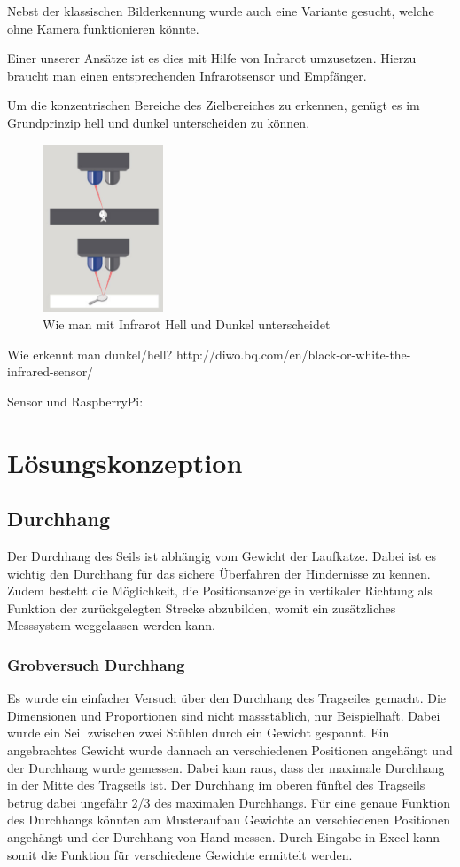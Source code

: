 \documentclass[a4paper]{report}
\begin{document}
Nebst der klassischen Bilderkennung wurde auch eine Variante gesucht, welche ohne Kamera funktionieren könnte.

Einer unserer Ansätze ist es dies mit Hilfe von Infrarot umzusetzen. Hierzu braucht man einen entsprechenden Infrarotsensor und Empfänger.

Um die konzentrischen Bereiche des Zielbereiches zu erkennen, genügt es im Grundprinzip hell und dunkel unterscheiden zu können.

\begin{figure}[h!]
	\centering
	\includegraphics[keepaspectratio,height=5cm]{InfrarotHellDunkel}
	\caption{Wie man mit Infrarot Hell und Dunkel unterscheidet}
	\label{fig:InfrarotHellDunkel}
\end{figure}


Wie erkennt man dunkel/hell?
http://diwo.bq.com/en/black-or-white-the-infrared-sensor/

Sensor und RaspberryPi:

\parencite{Aswinth2017}

\chapter{Lösungskonzeption}
\section{Durchhang}
Der Durchhang des Seils ist abhängig vom Gewicht der Laufkatze. Dabei ist es wichtig den Durchhang für das sichere Überfahren der Hindernisse zu kennen. Zudem besteht die Möglichkeit, die Positionsanzeige in vertikaler Richtung als Funktion der zurückgelegten Strecke abzubilden, womit ein zusätzliches Messsystem weggelassen werden kann.

\subsection{Grobversuch Durchhang}
Es wurde ein einfacher Versuch über den Durchhang des Tragseiles gemacht. Die Dimensionen und Proportionen sind nicht massstäblich, nur Beispielhaft. Dabei wurde ein Seil zwischen zwei Stühlen durch ein Gewicht gespannt. Ein angebrachtes Gewicht wurde dannach an verschiedenen Positionen angehängt und der Durchhang wurde gemessen. Dabei kam raus, dass der maximale Durchhang in der Mitte des Tragseils ist. Der Durchhang im oberen fünftel des Tragseils betrug dabei ungefähr 2/3 des maximalen Durchhangs.
Für eine genaue Funktion des Durchhangs könnten am Musteraufbau Gewichte an verschiedenen Positionen angehängt und der Durchhang von Hand messen. Durch Eingabe in Excel kann somit die Funktion für verschiedene Gewichte ermittelt werden.
\end{document}
